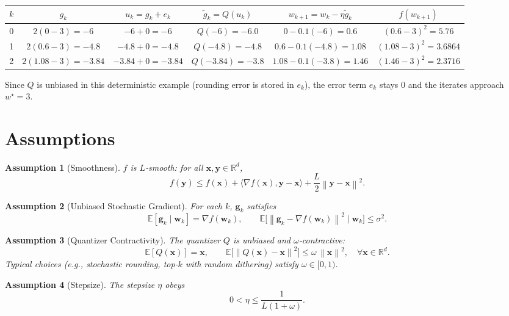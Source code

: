 \documentclass{article}
\newtheorem{assumption}{Assumption}
\newcommand{\E}{\mathbb{E}}
\newcommand{\R}{\mathbb{R}}
\newcommand{\norm}[1]{\left\lVert #1\right\rVert}
\begin{document}
\begin{center}
\begin{tabular}{c|c|c|c|c|c}
$k$ & $g_k$ & $u_k=g_k+e_k$ & $\tilde g_k=Q(u_k)$ & $w_{k+1}=w_k-\eta\tilde g_k$ & $f(w_{k+1})$\\\hline
0 & $2(0-3)=-6$ & $-6+0=-6$ & $Q(-6)=-6.0$ & $0-0.1(-6)=0.6$ & $(0.6-3)^2=5.76$\\
1 & $2(0.6-3)=-4.8$ & $-4.8+0= -4.8$ & $Q(-4.8)=-4.8$ & $0.6-0.1(-4.8)=1.08$ & $(1.08-3)^2=3.6864$\\
2 & $2(1.08-3)=-3.84$ & $-3.84+0= -3.84$ & $Q(-3.84)=-3.8$ & $1.08-0.1(-3.8)=1.46$ & $(1.46-3)^2=2.3716$
\end{tabular}
\end{center}
Since $Q$ is unbiased in this deterministic example (rounding error is stored in $e_k$), the error term $e_k$ stays $0$ and the iterates approach $w^\star=3$.

\newpage
\section*{Assumptions}
\begin{assumption}[Smoothness]\label{ass:smooth}
$f$ is $L$‑smooth: for all $\bm x,\bm y\in\R^{d}$,
\[
f(\bm y)\le f(\bm x)+\langle\nabla f(\bm x),\bm y-\bm x\rangle+\frac{L}{2}\norm{\bm y-\bm x}^2 .
\]
\end{assumption}
\begin{assumption}[Unbiased Stochastic Gradient]\label{ass:unbiased}
For each $k$, $\bm g_k$ satisfies 
\[
\E[\bm g_k\mid \bm w_k]=\nabla f(\bm w_k),\qquad 
\E\big[\norm{\bm g_k-\nabla f(\bm w_k)}^2\mid \bm w_k\big]\le\sigma^2 .
\]
\end{assumption}
\begin{assumption}[Quantizer Contractivity]\label{ass:quant}
The quantizer $Q$ is unbiased and $\omega$‑contractive:
\[
\E[Q(\bm x)]=\bm x,\qquad 
\E\big[\norm{Q(\bm x)-\bm x}^2\big]\le\omega\,\norm{\bm x}^2,\quad\forall\bm x\in\R^{d}.
\]
Typical choices (e.g., stochastic rounding, top‑$k$ with random dithering) satisfy $\omega\in[0,1)$.
\end{assumption}
\begin{assumption}[Stepsize]\label{ass:stepsize}
The stepsize $\eta$ obeys
\[
0<\eta\le\frac{1}{L(1+\omega)} .
\]
\end{assumption}
\end{document}
